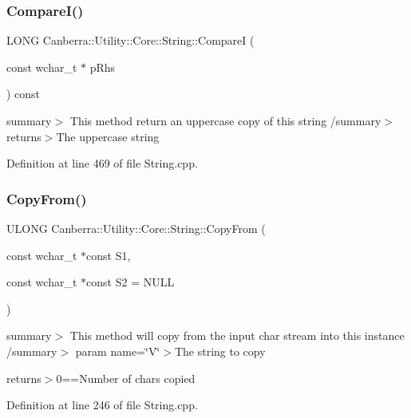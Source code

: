 \subsubsection{\texorpdfstring{Compare\+I()}{CompareI()}}
{\footnotesize\ttfamily L\+O\+NG Canberra\+::\+Utility\+::\+Core\+::\+String\+::\+CompareI (\begin{DoxyParamCaption}\item[{const wchar\+\_\+t $\ast$}]{p\+Rhs }\end{DoxyParamCaption}) const}

summary$>$ This method return an uppercase copy of this string /summary$>$ returns$>$The uppercase string

Definition at line 469 of file String.\+cpp.

\mbox{\label{class_canberra_1_1_utility_1_1_core_1_1_string_a1280c29e9ec36dd69411644e1c4fe340_a1280c29e9ec36dd69411644e1c4fe340}} 
\subsubsection{\texorpdfstring{Copy\+From()}{CopyFrom()}\hspace{0.1cm}{\footnotesize\ttfamily [1/2]}}
{\footnotesize\ttfamily U\+L\+O\+NG Canberra\+::\+Utility\+::\+Core\+::\+String\+::\+Copy\+From (\begin{DoxyParamCaption}\item[{const wchar\+\_\+t $\ast$const}]{S1,  }\item[{const wchar\+\_\+t $\ast$const}]{S2 = {\ttfamily NULL} }\end{DoxyParamCaption})}

summary$>$ This method will copy from the input char stream into this instance /summary$>$ param name=\char`\"{}\+V\char`\"{}$>$The string to copy

returns$>$0==Number of chars copied

Definition at line 246 of file String.\+cpp.

\mbox{\label{class_canberra_1_1_utility_1_1_core_1_1_string_aec45868a188d5dd9f93faf3a246613bc_aec45868a188d5dd9f93faf3a246613bc}} 
